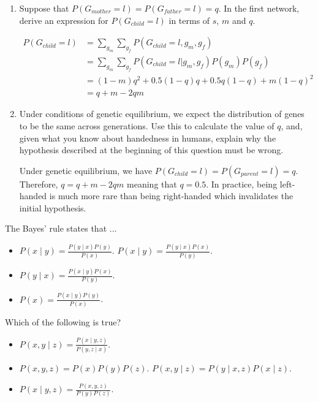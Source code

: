 \documentclass[11pt, a4paper]{article}
\begin{document}
\begin{enumerate}
    \item Suppose that $P(G_{mother} = l) = P(G_{father} = l) = q$. In the first network, derive an expression for $P(G_{child} = l)$ in terms of $s$, $m$ and $q$.
    \begin{solution}
        \begin{align*}
            P(G_{child} = l) & = \sum_{g_m} \sum_{g_f} P(G_{child} = l, g_m, g_f) \\
            & = \sum_{g_m} \sum_{g_f} P(G_{child} = l | g_m, g_f) P(g_m) P(g_f) \\
            & = (1 - m) q^2 + 0.5 (1 - q) q + 0.5 q (1 - q) + m (1 - q)^2 \\
            & = q + m - 2qm
        \end{align*}
    \end{solution}

    \item Under conditions of genetic equilibrium, we expect the distribution of genes to be the same across generations. Use this to calculate the value of $q$, and, given what you know about handedness in humans, explain why the hypothesis described at the beginning of this question must be wrong.

    \begin{solution}
        Under genetic equilibrium, we have $P(G_{child} = l) = P(G_{parent} = l) = q$. Therefore, $q = q + m - 2 q m$ meaning that $q = 0.5$. In practice, being left-handed is much more rare than being right-handed which invalidates the initial hypothesis.
    \end{solution}
\end{enumerate}

\newpage

\startquiz

The Bayes’ rule states that ...
\begin{itemize}
    \item $P(x\mid y) = \frac{P(y\mid x)P(y)}{P(x)}$.
    \solitem $P(x\mid y) = \frac{P(y\mid x)P(x)}{P(y)}$.
    \item $P(y\mid x) = \frac{P(x\mid y)P(x)}{P(y)}$.
    \item $P(x) = \frac{P(x\mid y)P(y)}{P(x)}$.
\end{itemize}

Which of the following is true?
\begin{itemize}
    \item $P(x, y \mid z) = \frac{P(x \mid y,z)}{P(y,z \mid x)}$.
    \item $P(x, y, z) = P(x)P(y)P(z)$.
    \solitem $P(x, y \mid z) = P(y\mid x,z)P(x\mid z)$. 
    \item $P(x\mid y,z) = \frac{P(x,y,z)}{P(y)P(z)}$.
\end{itemize}
\end{document}
